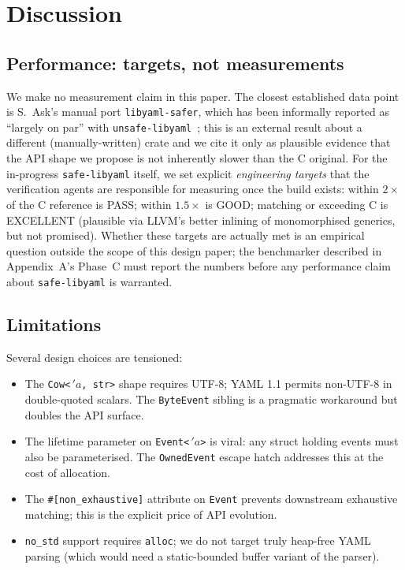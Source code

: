 \documentclass[12pt]{article}
\theoremstyle{definition}
\theoremstyle{remark}
\newcommand{\lifetime}[1]{\ensuremath{\,'\!#1}}
\begin{document}
\section{Discussion}
\label{sec:disc}

\subsection{Performance: targets, not measurements}

We make no measurement claim in this paper. The closest established data
point is S.~Ask's manual port \texttt{libyaml-safer}, which has been
informally reported as ``largely on par'' with
\texttt{unsafe-libyaml}~\cite{libyaml-safer-blog}; this is an external
result about a different (manually-written) crate and we cite it only as
plausible evidence that the API shape we propose is not inherently
slower than the C original. For the in-progress \texttt{safe-libyaml}
itself, we set explicit \emph{engineering targets} that the verification
agents are responsible for measuring once the build exists: within
$2\times$ of the C reference is PASS; within $1.5\times$ is GOOD; matching
or exceeding C is EXCELLENT (plausible via LLVM's better inlining of
monomorphised generics, but not promised). Whether these targets are
actually met is an empirical question outside the scope of this design
paper; the benchmarker described in Appendix~A's Phase~C must report the
numbers before any performance claim about \texttt{safe-libyaml} is
warranted.

\subsection{Limitations}

Several design choices are tensioned:

\begin{itemize}[leftmargin=2em]
\item The \texttt{Cow<\lifetime{a}, str>} shape requires UTF-8; YAML 1.1
permits non-UTF-8 in double-quoted scalars. The \texttt{ByteEvent} sibling
is a pragmatic workaround but doubles the API surface.
\item The lifetime parameter on \texttt{Event<\lifetime{a}>} is viral: any
struct holding events must also be parameterised. The \texttt{OwnedEvent}
escape hatch addresses this at the cost of allocation.
\item The \texttt{\#[non\_exhaustive]} attribute on \texttt{Event} prevents
downstream exhaustive matching; this is the explicit price of API evolution.
\item \texttt{no\_std} support requires \texttt{alloc}; we do not target
truly heap-free YAML parsing (which would need a static-bounded buffer
variant of the parser).
\end{itemize}
\end{document}
